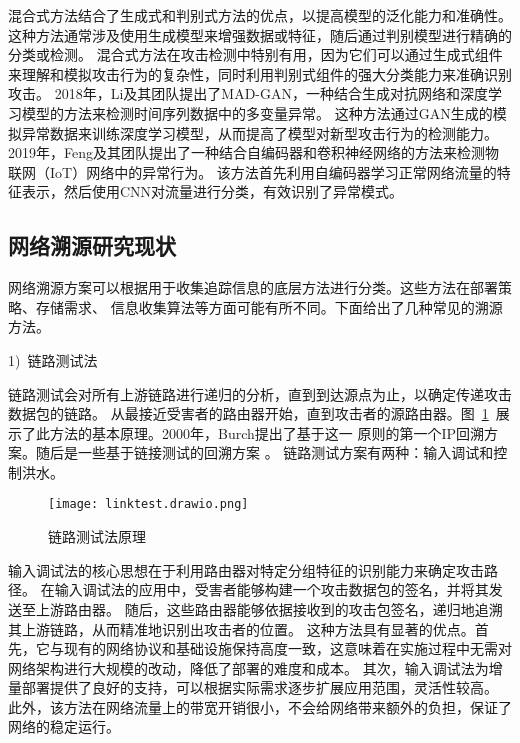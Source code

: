 混合式方法结合了生成式和判别式方法的优点，以提高模型的泛化能力和准确性。
这种方法通常涉及使用生成模型来增强数据或特征，随后通过判别模型进行精确的分类或检测。
混合式方法在攻击检测中特别有用，因为它们可以通过生成式组件来理解和模拟攻击行为的复杂性，同时利用判别式组件的强大分类能力来准确识别攻击。
2018年，Li及其团队提出了MAD-GAN\cite{li2018mad}，一种结合生成对抗网络和深度学习模型的方法来检测时间序列数据中的多变量异常。
这种方法通过GAN生成的模拟异常数据来训练深度学习模型，从而提高了模型对新型攻击行为的检测能力。
2019年，Feng及其团队提出了一种结合自编码器和卷积神经网络的方法来检测物联网（IoT）网络中的异常行为\cite{feng2019deep}。
该方法首先利用自编码器学习正常网络流量的特征表示，然后使用CNN对流量进行分类，有效识别了异常模式。

\subsection{网络溯源研究现状}
网络溯源方案可以根据用于收集追踪信息的底层方法进行分类。这些方法在部署策略、存储需求、
信息收集算法等方面可能有所不同。下面给出了几种常见的溯源方法\cite{singh2016}。\par

1)~链路测试法\par
链路测试会对所有上游链路进行递归的分析，直到到达源点为止，以确定传递攻击数据包的链路。
从最接近受害者的路由器开始，直到攻击者的源路由器。图~\ref{fig:linktest}~展示了此方法的基本原理。2000年，Burch提出了基于这一
原则的第一个IP回溯方案\cite{Burch2000Tracing}。随后是一些基于链接测试的回溯方案
\cite{bhavani2020ip,hasan2023deep,
ThingSlomanDulay2008DDoSDetection}。
链路测试方案有两种：输入调试和控制洪水。
\begin{figure}[htbp]
  \centering
  \texttt{[image: linktest.drawio.png]}
  \caption{链路测试法原理}
  \label{fig:linktest}
\end{figure}

输入调试法的核心思想在于利用路由器对特定分组特征的识别能力来确定攻击路径。
在输入调试法的应用中，受害者能够构建一个攻击数据包的签名，并将其发送至上游路由器。
随后，这些路由器能够依据接收到的攻击包签名，递归地追溯其上游链路，从而精准地识别出攻击者的位置。
这种方法具有显著的优点。首先，它与现有的网络协议和基础设施保持高度一致，这意味着在实施过程中无需对网络架构进行大规模的改动，降低了部署的难度和成本。
其次，输入调试法为增量部署提供了良好的支持，可以根据实际需求逐步扩展应用范围，灵活性较高。
此外，该方法在网络流量上的带宽开销很小，不会给网络带来额外的负担，保证了网络的稳定运行。

